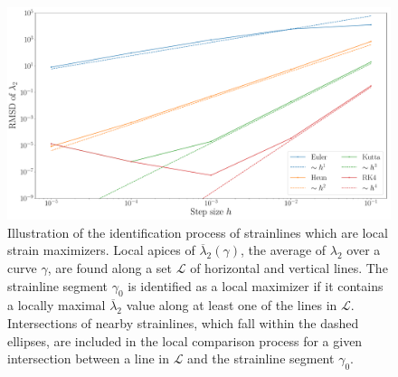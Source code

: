 \begin{figure}[htpb]
    \centering
    \includegraphics[width=0.8\linewidth]{figures/error_figures/eigenvalue2_errors_fixed_steplength.pdf}
    \caption[The identification process of strainlines which HOES BE AT BOI YE BOI BOII YE BOIIIII
    are local strain maximizers]{Illustration of the identification process of
        strainlines which are local strain maximizers.
        Local apices of $\overline{\lambda}_{2}(\gamma)$, the average of
        $\lambda_{2}$ over a curve $\gamma$, are found along a set $\mathcal{L}$
        of horizontal and vertical lines. The strainline segment
    $\gamma_{0}$ is identified as a local maximizer if it contains a locally
maximal $\overline{\lambda}_{2}$ value along at least one of the lines in
$\mathcal{L}$. Intersections of nearby strainlines, which fall within the dashed
ellipses, are included in the local comparison process for a given intersection
between a line in $\mathcal{L}$ and the strainline segment $\gamma_{0}$.}
    \label{fig:xi2err}
\end{figure}
